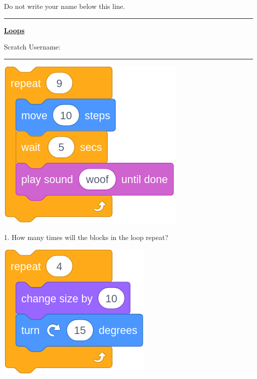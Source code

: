 \documentclass[letterpaper,12pt]{article}
\newcommand\numbox{%
    \fbox{\rule{1in}{0pt}\rule[-1ex]{0pt}{5ex}}}
\begin{document}
\noindent Do not write your name below this line. \\
\noindent \hrule
\begin{center}
{\Large \textbf{\underline{Loops}}} \\
\end{center}
Scratch Username: \rule{4cm}{0.4pt}

\noindent \dotfill


\begin{center}
\includegraphics[scale=.3]{q1_script0.png}
\end{center}
1. How many times will the blocks in the loop repeat?
\numbox \\

\noindent \dotfill
\begin{center}
\includegraphics[scale=.3]{q2_script0.png}
\end{center}
\end{document}
